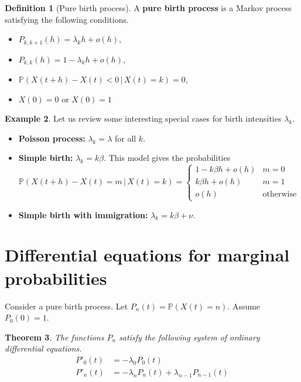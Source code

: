 \documentclass[10pt, oneside, reqno]{amsart}
\theoremstyle{plain}%
\newtheorem{thm}{Theorem}[section]
\theoremstyle{definition}
\newtheorem{defn}[thm]{Definition}
\newtheorem{exmp}[thm]{Example}
\theoremstyle{remark}
\newcommand{\prob}[1]{\mathbb{P}(#1)}
\newcommand{\given}{ \, | \,}
\begin{document}
\begin{defn}[Pure birth process]
    A \textbf{pure birth process} is a Markov process satisfying the following conditions.
    \begin{itemize}
        \item $P_{k,k+1}(h) = \lambda_k h + o(h)$,
        \item $P_{k,k}(h) = 1 - \lambda_k h + o(h)$,
        \item $\prob{X(t+h) - X(t) < 0 \given X(t) = k} = 0$,
        \item $X(0) = 0$ or $X(0) = 1$
    \end{itemize}
\end{defn}

\begin{exmp}
    Let us review some interesting special cases for birth intensities $\lambda_k$.
    
    \begin{itemize}
        \item \textbf{Poisson process:} $\lambda_k = \lambda$ for all $k$.
        \item \textbf{Simple birth:} $\lambda_k = k \beta$.  This model gives the probabilities \[
            \prob{X(t+h) - X(t) = m \given X(t) =k} = \begin{cases}
                1 - k\beta h + o(h) & m = 0 \\
                k\beta h + o(h) &m=1\\
                o(h) &\text{otherwise}
            \end{cases}
        \]
        \item \textbf{Simple birth with immigration:} $\lambda_k = k \beta + \nu$.  
    \end{itemize}
\end{exmp}


\section{Differential equations for marginal probabilities} %
\label{sub:differential_equations_for_marginal_probabilities}

Consider a pure birth process.  Let $P_n(t) = \prob{X(t) = n}$.  Assume $P_0(0) = 1$.
\begin{thm}
    The functions $P_n$ satisfy the following system of ordinary differential equations.
    \begin{align*}
        P'_0(t) &= -\lambda_0 P_0(t) \\
        P'_n(t) &= -\lambda_n P_n(t) + \lambda_{n-1} P_{n-1}(t)
    \end{align*}
\end{thm}
\end{document}
